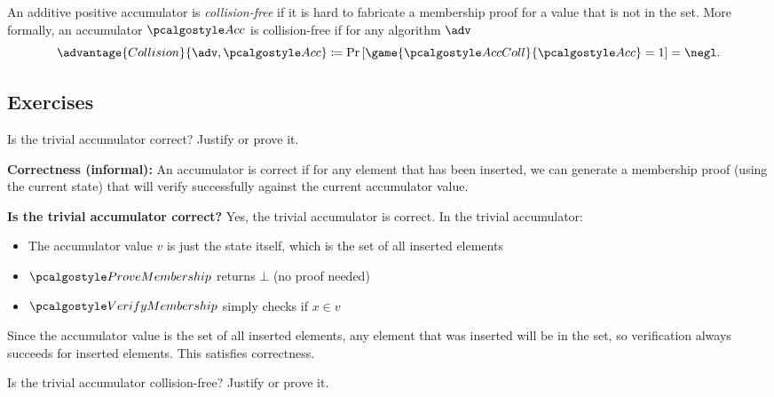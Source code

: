 \begin{definition}
    An additive positive accumulator is \emph{collision-free} if it is hard to fabricate a membership proof for a value that is not in the set.
    More formally, an accumulator $\algo{Acc}$ is collision-free if for any \ppt algorithm $\adv$
    \[
      \advantage{Collision}{\adv, \algo{Acc}} \defeq \pr{\game{\algo{AccColl}}{\algo{Acc}} = 1} = \negl.
    \]
\end{definition}

\subsection{Exercises}

\begin{exercise}
  Is the trivial accumulator correct?
  Justify or prove it.
\end{exercise}

\ifsolutions
\begin{mysolution}
  \textbf{Correctness (informal):} An accumulator is correct if for any element that has been inserted, we can generate a membership proof (using the current state) that will verify successfully against the current accumulator value.
  
  \textbf{Is the trivial accumulator correct?} Yes, the trivial accumulator is correct.
  In the trivial accumulator:
  \begin{itemize}
    \item The accumulator value $v$ is just the state itself, which is the set of all inserted elements
    \item $\algo{ProveMembership}$ returns $\bot$ (no proof needed)
    \item $\algo{VerifyMembership}$ simply checks if $x \in v$
  \end{itemize}
  
  Since the accumulator value is the set of all inserted elements, any element that was inserted will be in the set, so verification always succeeds for inserted elements.
  This satisfies correctness.
\end{mysolution}
\fi

\begin{exercise}
  Is the trivial accumulator collision-free?
  Justify or prove it.
\end{exercise}

